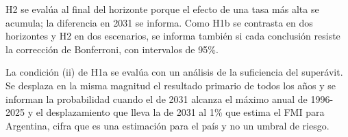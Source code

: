 H2 se evalúa al final del horizonte porque el efecto de una tasa más
alta se acumula; la diferencia en 2031 se informa. Como H1b se contrasta
en dos horizontes y H2 en dos escenarios, se informa también si cada
conclusión resiste la corrección de Bonferroni, con intervalos de 95\%.

La condición (ii) de H1a se evalúa con un análisis de la suficiencia del
superávit. Se desplaza en la misma magnitud el resultado primario de
todos los años y se informan la probabilidad cuando el de 2031 alcanza
el máximo anual de 1996-2025 y el desplazamiento que lleva la de 2031 al
1\% que estima el FMI para Argentina, cifra que es una estimación para
el país y no un umbral de riesgo.
